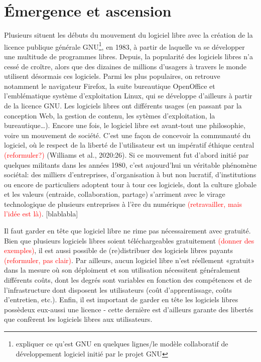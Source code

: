 \documentclass[
  letterpaper,
]{scrbook}
\begin{document}
\hypertarget{uxe9mergence-et-ascension}{%
\section{Émergence et ascension}\label{uxe9mergence-et-ascension}}

Plusieurs situent les débuts du mouvement du logiciel libre avec la
création de la licence publique générale GNU\footnote{expliquer ce
  qu'est GNU en quelques lignes/le modèle collaboratif de développement
  logiciel initié par le projet GNU}, en 1983, à partir de laquelle va
se développer une multitude de programmes libres. Depuis, la popularité
des logiciels libres n'a cessé de croître, alors que des dizaines de
millions d'usagers à travers le monde utilisent désormais ces logiciels.
Parmi les plus populaires, on retrouve notamment le navigateur Firefox,
la suite bureautique OpenOffice et l'emblématique système d'exploitation
Linux, qui se développe d'ailleurs à partir de la licence GNU. Les
logiciels libres ont différents usages (en passant par la conception
Web, la gestion de contenu, les sytèmes d'exploitation, la
bureautique\ldots). Encore une fois, le logiciel libre est avant-tout
une philosophie, voire un mouvement de société. C'est une façon de
concevoir la communauté du logiciel, où le respect de la liberté de
l'utilisateur est un impératif éthique central
\textcolor{red}{(reformuler?)} (Williams et al., 2020:26). Si ce
mouvement fut d'abord initié par quelques militants dans les années
1980, c'est aujourd'hui un véritable phénomène sociétal: des milliers
d'entreprises, d'organisation à but non lucratif, d'institutions ou
encore de particuliers adoptent tour à tour ces logiciels, dont la
culture globale et les valeurs (entraide, collaboration, partage)
s'arriment avec le virage technologique de plusieurs entreprises à l'ère
du numérique \textcolor{red}{(retravailler, mais l'idée est là)}.
{[}blablabla{]}

Il faut garder en tête que logiciel libre ne rime pas nécessairement
avec gratuité. Bien que plusieurs logiciels libres soient
téléchargeables gratuitement \textcolor{red}{(donner des exemples)}, il
est aussi possible de (re)distribuer des logiciels libres payants
\textcolor{red}{(reformuler, pas clair)}. Par ailleurs, aucun logiciel
libre n'est réellement «gratuit» dans la mesure où son déploiment et son
utilisation nécessitent généralement différents coûts, dont les degrés
sont variables en fonction des compétences et de l'infrastructure dont
disposent les utilisateurs (coût d'apprentissage, coûts d'entretien,
etc.). Enfin, il est important de garder en tête les logiciels libres
possèdeux eux-aussi une licence - cette dernière est d'ailleurs garante
des libertés que confèrent les logiciels libres aux utilisateurs.
\end{document}
